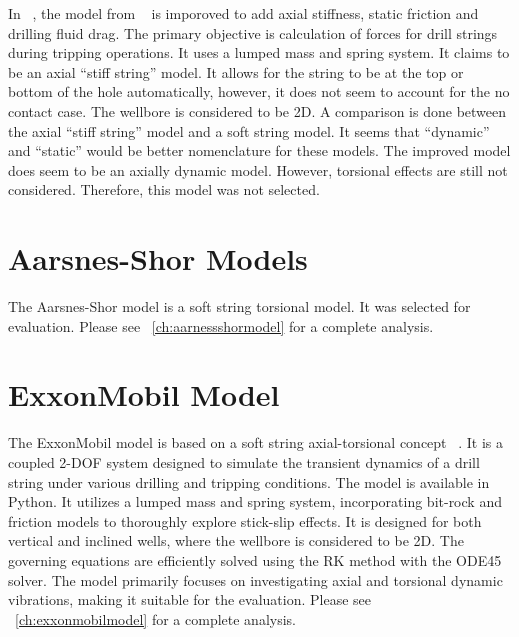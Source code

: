 In ~\cite{ref:zamanipour2018a}, the model from  ~\cite{ref:miska2015a} is imporoved to add axial stiffness, static friction and drilling fluid drag.  The primary objective is calculation of forces for drill strings during tripping operations.  It uses a lumped mass and spring system.  It claims to be an axial ``stiff string'' model.  It allows for the string to be at the top or bottom of the hole automatically, however, it does not seem to account for the no contact case.  The wellbore is considered to be 2D.  A comparison is done between the axial ``stiff string'' model and a soft string model.  It seems that ``dynamic'' and ``static'' would be better nomenclature for these models.  The improved model does seem to be an axially dynamic model.  However, torsional effects are still not considered.  Therefore, this model was not selected.



\section{Aarsnes-Shor Models}
The Aarsnes-Shor model is a soft string torsional model.  It was selected for evaluation.  Please see \chaptername~\ref{ch:aarnessshormodel} for a complete analysis.

\section{ExxonMobil Model}
The ExxonMobil model is based on a soft string axial-torsional concept ~\cite{ref:dixit2021a}. It is a coupled 2-DOF system designed to simulate the transient dynamics of a drill string under various drilling and tripping conditions. The model is available in Python. It utilizes a lumped mass and spring system, incorporating bit-rock and friction models to thoroughly explore stick-slip effects. It is designed for both vertical and inclined wells, where the wellbore is considered to be 2D. The governing equations are efficiently solved using the RK method with the ODE45 solver. The model primarily focuses on investigating axial and torsional dynamic vibrations, making it suitable for the evaluation. Please see \chaptername~\ref{ch:exxonmobilmodel} for a complete analysis. 